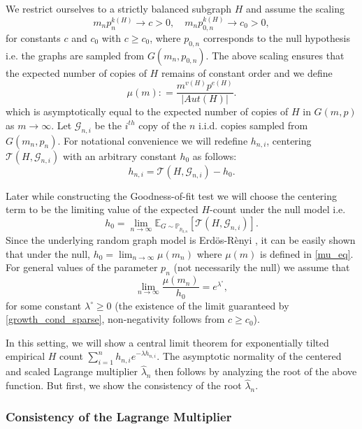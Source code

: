 \documentclass[12pt]{article}
\def\er{ Erd{\"o}s-R{\`e}nyi }
\numberwithin{equation}{section}
\begin{document}
We restrict ourselves to a strictly balanced subgraph \( H \) and assume the scaling
\begin{equation}
m_n p_n^{k(H)} \to c > 0,\quad
m_n p_{0,n}^{k(H)} \to c_0 > 0, \label{growth_cond_sparse}
\end{equation}
for constants $c$ and $c_0$ with $c \geq c_0$, where $p_{0,n}$ corresponds to the null hypothesis i.e. the graphs are sampled from $G(m_n,p_{0,n})$.
The above scaling ensures that the expected number of copies of \( H \) remains of constant order and we define
\begin{equation}
\mu(m): = \frac{m^{v(H)}p^{e(H)}}{|Aut(H)|}\label{mu_eq}.
\end{equation}
which is asymptotically equal to the expected number of copies of $H$ in $G(m,p)$ as $m\rightarrow\infty$. Let $\mathcal{G}_{n,i}$ be the $i^{th}$ copy of the $n$ i.i.d. copies sampled from $G(m_n,p_n)$. For notational convenience we will redefine $h_{n,i}$, centering $\mathcal{T}(H,\mathcal{G}_{n,i})$ with an arbitrary constant $h_0$ as follows:
$$h_{n,i}=\mathcal{T}(H,\mathcal{G}_{n,i})-h_0.$$

Later while constructing the Goodness-of-fit test we will choose the centering term to be the limiting value of the expected \( H \)-count under the null model i.e.  
\[
h_0=\lim_{n\rightarrow \infty}\mathbb{E}_{G\sim\mathbb{P}_{p_{0,n}}}[\mathcal{T}(H,\mathcal{G}_{n,i})].
\]
Since the underlying random graph model is \er, it can be easily shown that under the null, \( h_0 = \lim_{n\rightarrow \infty}\mu(m_n) \) where $\mu(m)$ is defined in \eqref{mu_eq}. For general values of the parameter $p_n$ (not necessarily the null) we assume that
\begin{equation}
\lim_{n \to \infty} \frac{\mu(m_n)}{h_0} = e^{\lambda^{\circ}}\label{lambda_0_defn},
\end{equation}
for some constant \( \lambda^{\circ} \geq 0\) (the existence of the limit guaranteed by \eqref{growth_cond_sparse}, non-negativity follows from $c \geq c_0$).

In this setting, we will show a central limit theorem for exponentially tilted empirical $H$ count $\sum_{i=1}^n h_{n,i} e^{-\lambda h_{n,i}}$. The asymptotic normality of the centered and scaled Lagrange multiplier $\hat{\lambda}_n$ then follows by analyzing the root of the above function. But first, we show the consistency of the root $\hat{\lambda}_n$.



\subsubsection{Consistency  of the Lagrange Multiplier}
\end{document}
